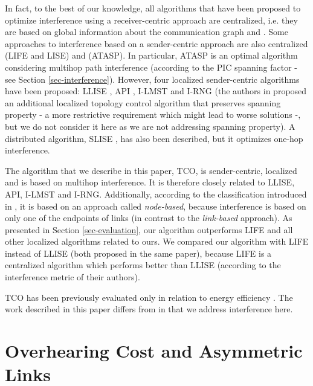 \documentclass{llncs}
\begin{document}
In fact, to the best of our knowledge, all algorithms that have been proposed to optimize interference
using a receiver-centric approach are centralized, i.e. they are based on global information about the communication graph 
\cite{fussen2005} \cite{moscibroda2005} \cite{rickenbach2005}
\cite{Wu2008} \cite{liu2008} and \cite{Gao2008}.
Some approaches to interference based on a sender-centric approach are also centralized \cite{burkhart2004} (LIFE and LISE) and \cite{blough2005} (ATASP). 
In particular, ATASP is an optimal algorithm considering multihop path interference (according to the PIC spanning factor - see Section \ref{sec-interference}). 
However, four localized sender-centric algorithms have been proposed:
LLISE \cite{burkhart2004}, API \cite{johansson2005}, I-LMST \cite{Li05} and I-RNG \cite{Li05}
(the authors in \cite{Li05} proposed an additional localized topology control algorithm that preserves spanning property - a more restrictive requirement which might
lead to worse solutions -, but we do not consider it here as 
we are not addressing spanning property). A distributed algorithm, SLISE \cite{damian2008}, has also been described, but it optimizes one-hop interference.

The algorithm that we describe in this paper, TCO, is sender-centric, localized and is based on multihop interference. It is therefore closely related to LLISE, API, I-LMST and \mbox{I-RNG}.
Additionally, according to the classification introduced in \cite{Li05}, it is based on an approach called \emph{node-based}, because interference is based on only one of the endpoints of links 
(in contrast to the \emph{link-based} approach). 
As presented in Section \ref{sec-evaluation}, our algorithm outperforms LIFE and all other localized algorithms related to ours. We compared our algorithm with LIFE instead of LLISE (both proposed in the same paper), because LIFE is a centralized algorithm 
which performs better than LLISE (according to the interference metric of their authors). 

TCO has been previously evaluated only in relation to energy efficiency \cite{Assis09,Telemaco2009}. 
The work described in this paper differs from \cite{Assis09,Telemaco2009} in that we address interference here.

\section{Overhearing Cost and Asymmetric Links}
\label{sec-support-tcoverhearing}
\end{document}
